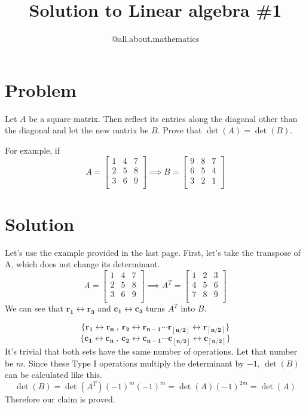 \documentclass[12pt]{article}
\title{Solution to Linear algebra \#1}
\author{@all.about.mathematics}
\date{}
\begin{document}
\maketitle
\large
\section{Problem}
Let $A$ be a square matrix. Then reflect its entries along the diagonal other than the diagonal and let the new matrix be $B$. Prove that $\det(A)=\det(B)$. 

\medskip
\noindent
For example, if
$$
A=
\begin{bmatrix} 
1 & 4 & 7 \\
2 & 5 & 8 \\
3 & 6 & 9 \\
\end{bmatrix}
\implies
B=
\begin{bmatrix} 
9 & 8 & 7 \\
6 & 5 & 4 \\
3 & 2 & 1 \\
\end{bmatrix}
$$
\newpage
\section{Solution}
Let's use the example provided in the last page. First, let's take the transpose of A, which does not change its determinant.
$$A=
\begin{bmatrix} 
1 & 4 & 7 \\
2 & 5 & 8 \\
3 & 6 & 9 \\
\end{bmatrix}
\implies
A^T=
\begin{bmatrix} 
1 & 2 & 3 \\
4 & 5 & 6 \\
7 & 8 & 9 \\
\end{bmatrix}$$
We can see that $\mathbf{r_1}\longleftrightarrow \mathbf{r_3}$ and $\mathbf{c_1} \longleftrightarrow \mathbf{c_3} $ turns $A^T$ into $B$.
\medskip

$$\{\mathbf{r_1}\longleftrightarrow\mathbf{r_n}\:,\: \mathbf{r_2}\longleftrightarrow\mathbf{r_{n-1}}\cdots \mathbf{r_{\left \lfloor{n/2}\right \rfloor}}\longleftrightarrow \mathbf{r_{\left \lceil{n/2}\right \rceil}}\} $$
$$\{\mathbf{c_1}\longleftrightarrow\mathbf{c_n}\:,\: \mathbf{c_2}\longleftrightarrow\mathbf{c_{n-1}}\cdots \mathbf{c_{\left \lfloor{n/2}\right \rfloor}}\longleftrightarrow \mathbf{c_{\left \lceil{n/2}\right \rceil}}\}$$
It's trivial that both sets have the same number of operations. Let that number be $m$. Since these Type I operations multiply the determinant by $-1$, $\det(B)$ can be calculated like this.
$$\det(B)=\det(A^T)(-1)^m(-1)^m= \det(A)(-1)^{2m}= \det(A)$$
Therefore our claim is proved.
\end{document}
